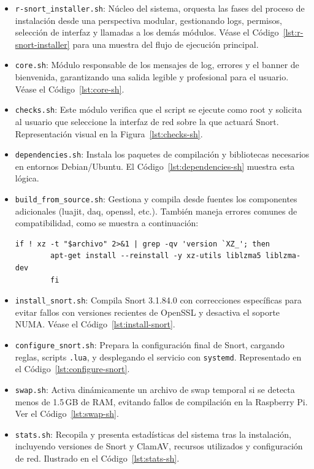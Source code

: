 \documentclass[11pt,a4paper,twoside]{report}
\begin{document}
\begin{itemize}
	\item \texttt{r-snort\_installer.sh}: Núcleo del sistema, orquesta las fases del proceso de instalación desde una perspectiva modular, gestionando logs, permisos, selección de interfaz y llamadas a los demás módulos.  
	Véase el Código~\ref{lst:r-snort-installer} para una muestra del flujo de ejecución principal.
	
	\item \texttt{core.sh}: Módulo responsable de los mensajes de log, errores y el banner de bienvenida, garantizando una salida legible y profesional para el usuario.  
	Véase el Código~\ref{lst:core-sh}.
	
	\item \texttt{checks.sh}: Este módulo verifica que el script se ejecute como root y solicita al usuario que seleccione la interfaz de red sobre la que actuará Snort.  
	Representación visual en la Figura~\ref{lst:checks-sh}.
	
	\item \texttt{dependencies.sh}: Instala los paquetes de compilación y bibliotecas necesarios en entornos Debian/Ubuntu.  
	El Código~\ref{lst:dependencies-sh} muestra esta lógica.
	
	\item \texttt{build\_from\_source.sh}: Gestiona y compila desde fuentes los componentes adicionales (luajit, daq, openssl, etc.).  
	También maneja errores comunes de compatibilidad, como se muestra a continuación:
	
	\begin{lstlisting}[style=snortstyle, caption={Corrección de versiones incompatibles de xz/liblzma}, label=lst:xz]
		if ! xz -t "$archivo" 2>&1 | grep -qv 'version `XZ_'; then
		apt-get install --reinstall -y xz-utils liblzma5 liblzma-dev
		fi
	\end{lstlisting}
	
	\item \texttt{install\_snort.sh}: Compila Snort 3.1.84.0 con correcciones específicas para evitar fallos con versiones recientes de OpenSSL y desactiva el soporte NUMA.  
	Véase el Código~\ref{lst:install-snort}.
	
	\item \texttt{configure\_snort.sh}: Prepara la configuración final de Snort, cargando reglas, scripts \texttt{.lua}, y desplegando el servicio con \texttt{systemd}.  
	Representado en el Código~\ref{lst:configure-snort}.
	
	\item \texttt{swap.sh}: Activa dinámicamente un archivo de swap temporal si se detecta menos de 1.5\,GB de RAM, evitando fallos de compilación en la Raspberry Pi.  
	Ver el Código~\ref{lst:swap-sh}.
	
	\item \texttt{stats.sh}: Recopila y presenta estadísticas del sistema tras la instalación, incluyendo versiones de Snort y ClamAV, recursos utilizados y configuración de red.  
	Ilustrado en el Código~\ref{lst:stats-sh}.
\end{itemize}
\end{document}

